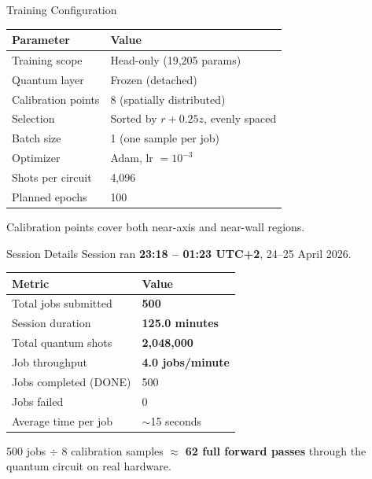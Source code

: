 \documentclass[aspectratio=169]{beamer}
\begin{document}
\begin{frame}{Training Configuration}
\begin{table}
\centering
\small
\begin{tabular}{ll}
\toprule
Parameter & Value \\
\midrule
Training scope & Head-only (19,205 params) \\
Quantum layer & Frozen (detached) \\
Calibration points & 8 (spatially distributed) \\
Selection & Sorted by $r + 0.25z$, evenly spaced \\
Batch size & 1 (one sample per job) \\
Optimizer & Adam, lr $=10^{-3}$ \\
Shots per circuit & 4,096 \\
Planned epochs & 100 \\
\bottomrule
\end{tabular}
\end{table}

Calibration points cover both near-axis and near-wall regions.
\end{frame}

\begin{frame}{Session Details}
Session ran \textbf{23:18 -- 01:23 UTC+2}, 24--25 April 2026.

\begin{table}
\centering
\begin{tabular}{ll}
\toprule
Metric & Value \\
\midrule
Total jobs submitted & \textbf{500} \\
Session duration & \textbf{125.0 minutes} \\
Total quantum shots & \textbf{2,048,000} \\
Job throughput & \textbf{4.0 jobs/minute} \\
Jobs completed (DONE) & 500 \\
Jobs failed & 0 \\
Average time per job & $\sim$15 seconds \\
\bottomrule
\end{tabular}
\end{table}

500 jobs $\div$ 8 calibration samples $\approx$ \textbf{62 full forward passes} through the quantum circuit on real hardware.
\end{frame}
\end{document}

